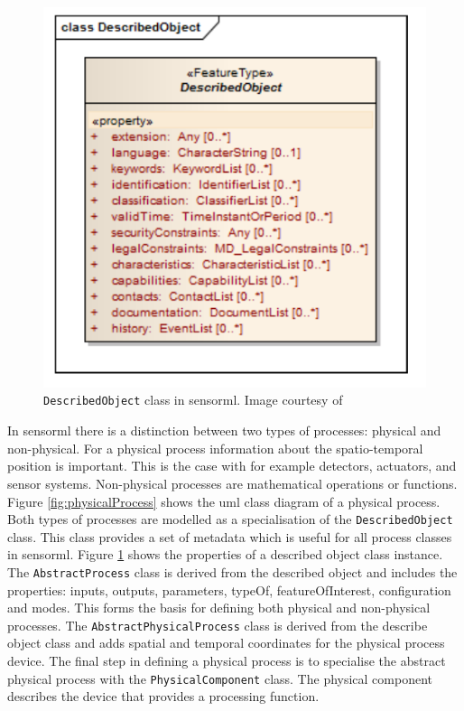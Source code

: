\begin{figure}
	\centering
	\includegraphics[width=0.5\linewidth]{UML/describedObject.png}
	\caption{\texttt{DescribedObject} class in \ac{sensorml}. Image courtesy of \cite[p. 39]{SW:OGC7}}
	\label{fig:describedObject}
\end{figure}

In \ac{sensorml} there is a distinction between two types of processes: physical and non-physical. For a physical process information about the spatio-temporal position is important. This is the case with for example detectors, actuators, and sensor systems. Non-physical processes are mathematical operations or functions. Figure \ref{fig:physicalProcess} shows the \ac{uml} class diagram of a physical process. Both types of processes are modelled as a specialisation of the \texttt{DescribedObject} class. This class provides a set of metadata which is useful for all process classes in \ac{sensorml}. Figure \ref{fig:describedObject} shows the properties of a described object class instance. The \texttt{AbstractProcess} class is derived from the described object and includes the properties: inputs, outputs, parameters, typeOf, featureOfInterest, configuration and modes. This forms the basis for defining both physical and non-physical processes. The \texttt{AbstractPhysicalProcess}  class is derived from the describe object class and adds spatial and temporal coordinates for the physical process device. The final step in defining a physical process is to specialise the abstract physical process with the \texttt{PhysicalComponent} class. The physical component describes the device that provides a processing function. 

